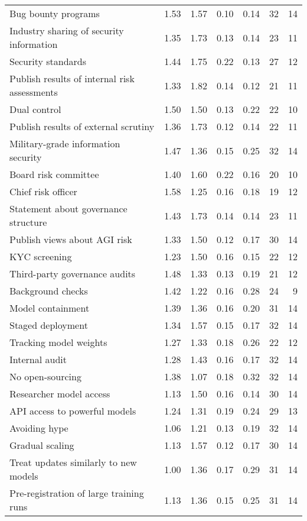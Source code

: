 \documentclass{article}
\begin{document}
\begin{sidewaystable}
\begin{tabular}{l*{6}{r}}
Bug bounty programs & 1.53 & 1.57 & 0.10 & 0.14 & 32 & 14 \\
Industry sharing of security information & 1.35 & 1.73 & 0.13 & 0.14 & 23 & 11 \\
Security standards & 1.44 & 1.75 & 0.22 & 0.13 & 27 & 12 \\
Publish results of internal risk assessments & 1.33 & 1.82 & 0.14 & 0.12 & 21 & 11 \\
Dual control & 1.50 & 1.50 & 0.13 & 0.22 & 22 & 10 \\
Publish results of external scrutiny & 1.36 & 1.73 & 0.12 & 0.14 & 22 & 11 \\
Military-grade information security & 1.47 & 1.36 & 0.15 & 0.25 & 32 & 14 \\
Board risk committee & 1.40 & 1.60 & 0.22 & 0.16 & 20 & 10 \\
Chief risk officer & 1.58 & 1.25 & 0.16 & 0.18 & 19 & 12 \\
Statement about governance structure & 1.43 & 1.73 & 0.14 & 0.14 & 23 & 11 \\
Publish views about AGI risk & 1.33 & 1.50 & 0.12 & 0.17 & 30 & 14 \\
KYC screening & 1.23 & 1.50 & 0.16 & 0.15 & 22 & 12 \\
Third-party governance audits & 1.48 & 1.33 & 0.13 & 0.19 & 21 & 12 \\
Background checks & 1.42 & 1.22 & 0.16 & 0.28 & 24 & 9 \\
Model containment & 1.39 & 1.36 & 0.16 & 0.20 & 31 & 14 \\
Staged deployment & 1.34 & 1.57 & 0.15 & 0.17 & 32 & 14 \\
Tracking model weights & 1.27 & 1.33 & 0.18 & 0.26 & 22 & 12 \\
Internal audit & 1.28 & 1.43 & 0.16 & 0.17 & 32 & 14 \\
No open-sourcing & 1.38 & 1.07 & 0.18 & 0.32 & 32 & 14 \\
Researcher model access & 1.13 & 1.50 & 0.16 & 0.14 & 30 & 14 \\
API access to powerful models & 1.24 & 1.31 & 0.19 & 0.24 & 29 & 13 \\
Avoiding hype & 1.06 & 1.21 & 0.13 & 0.19 & 32 & 14 \\
Gradual scaling & 1.13 & 1.57 & 0.12 & 0.17 & 30 & 14 \\
Treat updates similarly to new models & 1.00 & 1.36 & 0.17 & 0.29 & 31 & 14 \\
Pre-registration of large training runs & 1.13 & 1.36 & 0.15 & 0.25 & 31 & 14 \\

\end{tabular}
\end{sidewaystable}
\end{document}
